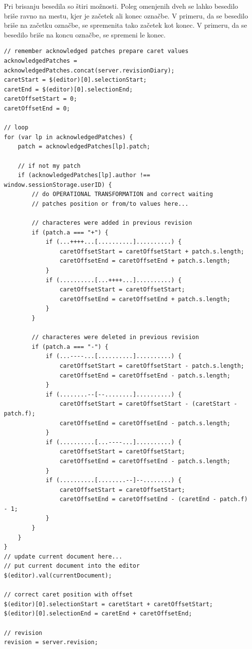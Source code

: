 \documentclass[a4paper, 12pt, twoside]{book}
\begin{document}
Pri brisanju besedila so štiri možnosti. Poleg omenjenih dveh se lahko besedilo briše ravno na mestu, kjer je začetek ali konec označbe. V primeru, da se besedilo briše na začetku označbe, se spremenita tako začetek kot konec. V primeru, da se besedilo briše na koncu označbe, se spremeni le konec.\newline

\begin{lstlisting}[title={Koda 6.6: Popravljanje pozicije utripalke na strani odjemalca.}]
// remember acknowledged patches prepare caret values
acknowledgedPatches = acknowledgedPatches.concat(server.revisionDiary);
caretStart = $(editor)[0].selectionStart;
caretEnd = $(editor)[0].selectionEnd;
caretOffsetStart = 0;
caretOffsetEnd = 0;

// loop
for (var lp in acknowledgedPatches) {
    patch = acknowledgedPatches[lp].patch;

    // if not my patch
    if (acknowledgedPatches[lp].author !== window.sessionStorage.userID) {
        // do OPERATIONAL TRANSFORMATION and correct waiting
        // patches position or from/to values here...

        // characteres were added in previous revision
        if (patch.a === "+") {
            if (...++++...[..........]..........) {
                caretOffsetStart = caretOffsetStart + patch.s.length;
                caretOffsetEnd = caretOffsetEnd + patch.s.length;
            }
            if (..........[...++++...]..........) {
                caretOffsetStart = caretOffsetStart;
                caretOffsetEnd = caretOffsetEnd + patch.s.length;
            }
        }

        // characteres were deleted in previous revision
        if (patch.a === "-") {
            if (...----...[..........]..........) {
                caretOffsetStart = caretOffsetStart - patch.s.length;
                caretOffsetEnd = caretOffsetEnd - patch.s.length;
            }
            if (........--[--........]..........) {
                caretOffsetStart = caretOffsetStart - (caretStart - patch.f);
                caretOffsetEnd = caretOffsetEnd - patch.s.length;
            }
            if (..........[...----...]..........) {
                caretOffsetStart = caretOffsetStart;
                caretOffsetEnd = caretOffsetEnd - patch.s.length;
            }
            if (..........[........--]--........) {
                caretOffsetStart = caretOffsetStart;
                caretOffsetEnd = caretOffsetEnd - (caretEnd - patch.f) - 1;
            }
        }
    }
}
// update current document here...
// put current document into the editor
$(editor).val(currentDocument);

// correct caret position with offset
$(editor)[0].selectionStart = caretStart + caretOffsetStart;
$(editor)[0].selectionEnd = caretEnd + caretOffsetEnd;

// revision
revision = server.revision;
\end{lstlisting}
\end{document}
